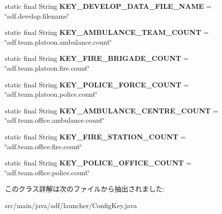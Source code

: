 \begin{DoxyCompactItemize}
\item 
\hypertarget{classadf_1_1launcher_1_1ConfigKey_a6f15b699a23c72a180972aa94a87c1d0}{}\label{classadf_1_1launcher_1_1ConfigKey_a6f15b699a23c72a180972aa94a87c1d0} 
static final String {\bfseries K\+E\+Y\+\_\+\+D\+E\+V\+E\+L\+O\+P\+\_\+\+D\+A\+T\+A\+\_\+\+F\+I\+L\+E\+\_\+\+N\+A\+ME} = \char`\"{}adf.\+develop.\+filename\char`\"{}
\item 
\hypertarget{classadf_1_1launcher_1_1ConfigKey_a83c4e3c1785b5f15d18579123de26c5e}{}\label{classadf_1_1launcher_1_1ConfigKey_a83c4e3c1785b5f15d18579123de26c5e} 
static final String {\bfseries K\+E\+Y\+\_\+\+A\+M\+B\+U\+L\+A\+N\+C\+E\+\_\+\+T\+E\+A\+M\+\_\+\+C\+O\+U\+NT} = \char`\"{}adf.\+team.\+platoon.\+ambulance.\+count\char`\"{}
\item 
\hypertarget{classadf_1_1launcher_1_1ConfigKey_a753cf9e721aefb1eb0daffaaef78e08c}{}\label{classadf_1_1launcher_1_1ConfigKey_a753cf9e721aefb1eb0daffaaef78e08c} 
static final String {\bfseries K\+E\+Y\+\_\+\+F\+I\+R\+E\+\_\+\+B\+R\+I\+G\+A\+D\+E\+\_\+\+C\+O\+U\+NT} = \char`\"{}adf.\+team.\+platoon.\+fire.\+count\char`\"{}
\item 
\hypertarget{classadf_1_1launcher_1_1ConfigKey_af2da4cab9f474b02da3727a596b5aa92}{}\label{classadf_1_1launcher_1_1ConfigKey_af2da4cab9f474b02da3727a596b5aa92} 
static final String {\bfseries K\+E\+Y\+\_\+\+P\+O\+L\+I\+C\+E\+\_\+\+F\+O\+R\+C\+E\+\_\+\+C\+O\+U\+NT} = \char`\"{}adf.\+team.\+platoon.\+police.\+count\char`\"{}
\item 
\hypertarget{classadf_1_1launcher_1_1ConfigKey_a382f104371b41b3f1622f216d4a1eb96}{}\label{classadf_1_1launcher_1_1ConfigKey_a382f104371b41b3f1622f216d4a1eb96} 
static final String {\bfseries K\+E\+Y\+\_\+\+A\+M\+B\+U\+L\+A\+N\+C\+E\+\_\+\+C\+E\+N\+T\+R\+E\+\_\+\+C\+O\+U\+NT} = \char`\"{}adf.\+team.\+office.\+ambulance.\+count\char`\"{}
\item 
\hypertarget{classadf_1_1launcher_1_1ConfigKey_ac2cafe080c33a0235e7b1fd4208d11af}{}\label{classadf_1_1launcher_1_1ConfigKey_ac2cafe080c33a0235e7b1fd4208d11af} 
static final String {\bfseries K\+E\+Y\+\_\+\+F\+I\+R\+E\+\_\+\+S\+T\+A\+T\+I\+O\+N\+\_\+\+C\+O\+U\+NT} = \char`\"{}adf.\+team.\+office.\+fire.\+count\char`\"{}
\item 
\hypertarget{classadf_1_1launcher_1_1ConfigKey_ae89d1a0ee70adf2736e98539cab90b8d}{}\label{classadf_1_1launcher_1_1ConfigKey_ae89d1a0ee70adf2736e98539cab90b8d} 
static final String {\bfseries K\+E\+Y\+\_\+\+P\+O\+L\+I\+C\+E\+\_\+\+O\+F\+F\+I\+C\+E\+\_\+\+C\+O\+U\+NT} = \char`\"{}adf.\+team.\+office.\+police.\+count\char`\"{}
\end{DoxyCompactItemize}


このクラス詳解は次のファイルから抽出されました\+:\begin{DoxyCompactItemize}
\item 
src/main/java/adf/launcher/Config\+Key.\+java\end{DoxyCompactItemize}
